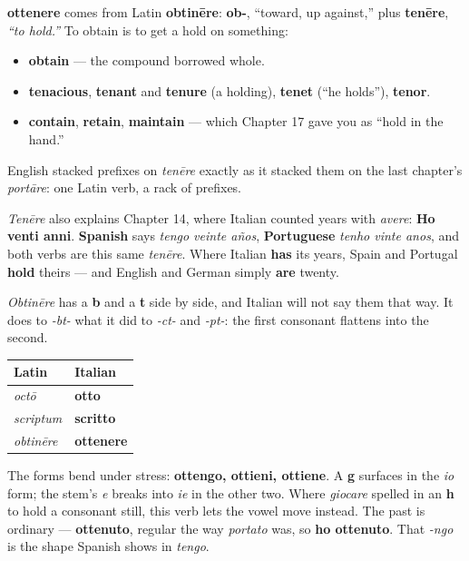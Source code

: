 \begin{cousinweb}
\textbf{ottenere} comes from Latin \textbf{obtinēre}: \textbf{ob-}, \textquotedblleft{}toward, up against,\textquotedblright{} plus \textbf{tenēre}, \emph{\textquotedblleft{}to hold.\textquotedblright{}} To obtain is to get a hold on something:

\begin{itemize}
\raggedright
  \item \textbf{obtain} — the compound borrowed whole.
  \item \textbf{tenacious}, \textbf{tenant} and \textbf{tenure} (a holding), \textbf{tenet} (\textquotedblleft{}he holds\textquotedblright{}), \textbf{tenor}.
  \item \textbf{contain}, \textbf{retain}, \textbf{maintain} — which Chapter 17 gave you as \textquotedblleft{}hold in the hand.\textquotedblright{}
\end{itemize}

English stacked prefixes on \emph{tenēre} exactly as it stacked them on the last chapter's \emph{portāre}: one Latin verb, a rack of prefixes.

\emph{Tenēre} also explains Chapter 14, where Italian counted years with \emph{avere}: \textbf{Ho venti anni}. \textbf{Spanish} says \emph{tengo veinte años}, \textbf{Portuguese} \emph{tenho vinte anos}, and both verbs are this same \emph{tenēre}. Where Italian \textbf{has} its years, Spain and Portugal \textbf{hold} theirs — and English and German simply \textbf{are} twenty.
\end{cousinweb}

\begin{grammarlens}[title={Grammar Lens: bt lands on tt, and a stem that bends}]
\emph{Obtinēre} has a \textbf{b} and a \textbf{t} side by side, and Italian will not say them that way. It does to \emph{-bt-} what it did to \emph{-ct-} and \emph{-pt-}: the first consonant flattens into the second.

\noindent
\begin{tabularx}{\linewidth}{@{}>{\raggedright\arraybackslash}X>{\raggedright\arraybackslash}X@{}}
\toprule
\textbf{Latin} & \textbf{Italian} \\
\midrule
\emph{octō} & \textbf{otto} \\
\emph{scriptum} & \textbf{scritto} \\
\emph{obtinēre} & \textbf{ottenere} \\
\bottomrule
\end{tabularx}

The forms bend under stress: \textbf{ottengo, ottieni, ottiene}. A \textbf{g} surfaces in the \emph{io} form; the stem's \emph{e} breaks into \emph{ie} in the other two. Where \emph{giocare} spelled in an \textbf{h} to hold a consonant still, this verb lets the vowel move instead. The past is ordinary — \textbf{ottenuto}, regular the way \emph{portato} was, so \textbf{ho ottenuto}. That \emph{-ngo} is the shape Spanish shows in \emph{tengo}.
\end{grammarlens}

